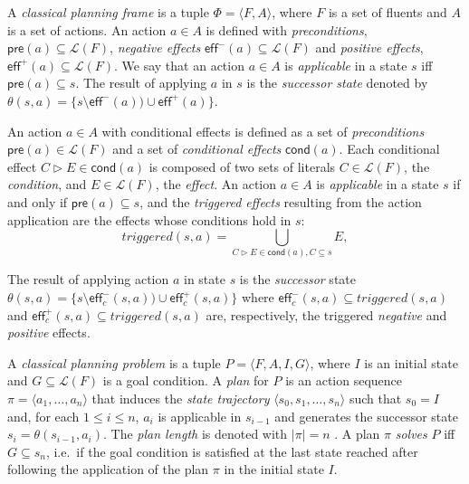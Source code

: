 \documentclass[3p,times]{elsarticle}
\newcommand{\pre}{\mathsf{pre}}  %
\newcommand{\eff}{\mathsf{eff}}  %
\newcommand{\cond}{\mathsf{cond}}   %
\newcommand{\tup}[1]{{\langle #1 \rangle}}
\begin{document}
A {\em classical planning frame} is a tuple $\Phi=\tup{F,A}$, where $F$ is a set of fluents and $A$ is a set of actions. An action $a\in A$ is defined with {\em preconditions}, $\pre(a)\subseteq\mathcal{L}(F)$, {\em negative effects} $\eff^-(a)\subseteq\mathcal{L}(F)$ and {\em positive effects}, $\eff^+(a)\subseteq\mathcal{L}(F)$. We say that an action $a\in A$ is {\em applicable} in a state $s$ iff $\pre(a)\subseteq s$. The result of applying $a$ in $s$ is the {\em successor state} denoted by $\theta(s,a)=\{s\setminus\eff^-(a))\cup\eff^+(a)\}$.



An action $a\in A$ with conditional effects is defined as a set of {\em preconditions} $\pre(a)\in\mathcal{L}(F)$ and a set of {\em conditional effects} $\cond(a)$. Each conditional effect $C\rhd E\in\cond(a)$ is composed of two sets of literals $C\in\mathcal{L}(F)$, the {\em condition}, and $E\in\mathcal{L}(F)$, the {\em effect}. An action $a\in A$ is {\em applicable} in a state $s$ if and only if $\pre(a)\subseteq s$, and the {\em triggered effects} resulting from the action application are the effects whose conditions hold in $s$:
\[
triggered(s,a)=\bigcup_{C\rhd E\in\cond(a),C\subseteq s} E,
\]

The result of applying action $a$ in state $s$ is the {\em successor} state $\theta(s,a)=\{s\setminus\eff_c^-(s,a))\cup\eff_c^+(s,a)\}$ where $\eff_c^-(s,a)\subseteq triggered(s,a)$ and $\eff_c^+(s,a)\subseteq triggered(s,a)$ are, respectively, the triggered {\em negative} and {\em positive} effects.


A {\em classical planning problem} is a tuple $P=\tup{F,A,I,G}$, where $I$ is an initial state and $G\subseteq\mathcal{L}(F)$ is a goal condition. A {\em plan} for $P$ is an action sequence $\pi=\tup{a_1, \ldots, a_n}$ that induces the {\em state trajectory} $\tup{s_0, s_1, \ldots, s_n}$ such that $s_0=I$ and, for each {\small $1\leq i\leq n$}, $a_i$ is applicable in $s_{i-1}$ and generates the successor state $s_i=\theta(s_{i-1},a_i)$. The {\em plan length} is denoted with $|\pi|=n$ . A plan $\pi$ {\em solves} $P$ iff $G\subseteq s_n$, i.e.~if the goal condition is satisfied at the last state reached after following the application of the plan $\pi$ in the initial state $I$.
\end{document}
